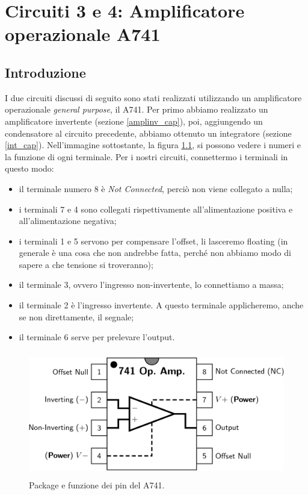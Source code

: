 \documentclass{report}
\begin{document}
\chapter{Circuiti 3 e 4: Amplificatore operazionale \textmu A741}
\section{Introduzione} 
I due circuiti discussi di seguito sono stati realizzati utilizzando un amplificatore operazionale \textit{general purpose}, il \textmu A741. Per primo abbiamo realizzato un amplificatore invertente (sezione \ref{amplinv_cap}), poi, aggiungendo un condensatore al circuito precedente, abbiamo ottenuto un integratore (sezione \ref{int_cap}). Nell'immagine sottostante, la figura \ref{figura:741}, si possono vedere i numeri e la funzione di ogni terminale. Per i nostri circuiti, connettermo i terminali in questo modo:
\begin{itemize}
\item il terminale numero 8 è \textit{Not Connected}, perciò non viene collegato a nulla;
\item i terminali 7 e 4 sono collegati rispettivamente all'alimentazione positiva e all'alimentazione negativa;
\item i terminali 1 e 5 servono per compensare l'offset, li lasceremo floating (in generale è una cosa che non andrebbe fatta, perché non abbiamo modo di sapere a che tensione si troveranno);
\item il terminale 3, ovvero l'ingresso non-invertente, lo connettiamo a massa;
\item il terminale 2 è l'ingresso invertente. A questo terminale applicheremo, anche se non direttamente, il segnale; 
\item il terminale 6 serve per prelevare l'output.
\end{itemize}
\begin{figure}[h]
\centering
\includegraphics[height=5.5cm]{immagini/741pinout}
\caption{Package e funzione dei pin del \textmu A741.}
\label{figura:741}
\end{figure}
\end{document}
